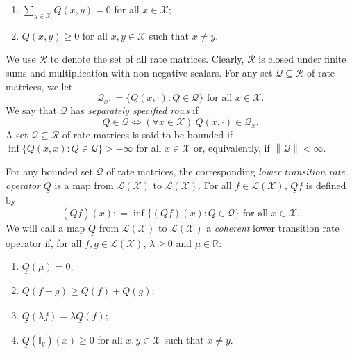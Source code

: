 \documentclass[a4paper,reqno]{amsart}
\newcommand{\reals}{\mathbb{R}}
\newcommand{\states}{\mathcal{X}}
\newcommand{\gambles}{\mathcal{L}}
\newcommand{\gamblesX}{\gambles(\states)}
\newcommand{\ind}[1]{\mathbb{I}_{#1}}
\newcommand{\rateset}{\mathcal{Q}}
\newcommand{\lrate}{\underline{Q}}
\newcommand{\asa}{\Leftrightarrow}
\newcommand{\norm}[1]{\left\lVert #1 \right\rVert}
\newcommand{\coloneqq}{:\!=}
\begin{document}
\vspace{5pt}
\begin{enumerate}[label=R\arabic*:]
\item
$\sum_{y\in\states}Q(x,y)=0$ for all $x\in\states$;
\item
$Q(x,y)\geq0$ for all $x,y\in\states$ such that $x\neq y$.
\end{enumerate}
\vspace{5pt}
\noindent
We use $\mathcal{R}$ to denote the set of all rate matrices. Clearly, $\mathcal{R}$ is closed under finite sums and multiplication with non-negative scalars. For any set $\rateset\subseteq\mathcal{R}$ of rate matrices, we let
\begin{equation*}
\rateset_x\coloneqq\{Q(x,\cdot)\colon Q\in\rateset\}
\text{ for all $x\in\states$.}
\end{equation*}
We say that $\rateset$ has \emph{separately specified rows} if
\begin{equation*}
Q\in\rateset\asa(\forall x\in\states)~Q(x,\cdot)\in\rateset_x.
\end{equation*}
A set $\rateset\subseteq\mathcal{R}$ of rate matrices is said to be bounded if $\inf\{Q(x,x)\colon Q\in\rateset\}>-\infty$ for all $x\in\states$ or, equivalently, if $\norm{\rateset}<\infty$. 

For any bounded set $\rateset$ of rate matrices, the corresponding \emph{lower transition rate operator} $\lrate$ is a map from $\gamblesX$ to $\gamblesX$. For all $f\in\gamblesX$, $\lrate f$ is defined by
\begin{equation}\label{eq:deflowerbound}
(\lrate f)(x)\coloneqq\inf\{(Qf)(x)\colon Q\in\rateset\}\text{ for all $x\in\states$}.
\end{equation}
We will call a map $\lrate$ from $\gamblesX$ to $\gamblesX$ a \emph{coherent} lower transition rate operator if, for all $f,g\in\gamblesX$, $\lambda\geq0$ and $\mu\in\reals$:

\vspace{5pt}
\begin{enumerate}[label=LR\arabic*:]
\item
$\lrate(\mu)=0$;
\item
$\lrate(f+g)\geq\lrate(f)+\lrate(g)$;
\item
$\lrate(\lambda f)=\lambda\lrate(f)$;
\item
$\lrate(\ind{y})(x)\geq0$ for all $x,y\in\states$ such that $x\neq y$.
\end{enumerate}
\vspace{5pt}
\end{document}
